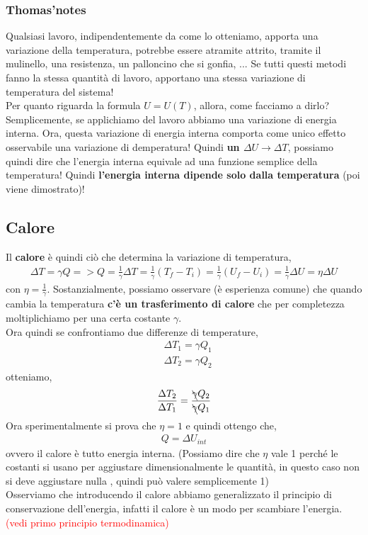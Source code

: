         \subsubsection{Thomas'notes}
            Qualsiasi lavoro, indipendentemente da come lo otteniamo, apporta una variazione della temperatura, potrebbe essere atramite attrito, tramite il mulinello, una resistenza, un palloncino che si gonfia, ... Se tutti questi metodi fanno la stessa quantità di lavoro, apportano una stessa variazione di temperatura del sistema! \\
            Per quanto riguarda la formula $U = U(T)$, allora, come facciamo a dirlo? Semplicemente, se applichiamo del lavoro abbiamo una variazione di energia interna. Ora, questa variazione di energia interna comporta come unico effetto osservabile una variazione di demperatura! Quindi \textbf{un $\Delta U\rightarrow \Delta T$}, possiamo quindi dire che l'energia interna equivale ad una funzione semplice della temperatura! Quindi \textbf{l'energia interna dipende solo dalla temperatura} (poi viene dimostrato)!

    \subsection{Calore}
        Il \textbf{calore} è quindi ciò che determina la variazione di temperatura,
        \begin{align*}
            \Delta T = \gamma Q => Q = \frac{1}{\gamma}\Delta T = \frac{1}{\gamma}(T_f - T_i) = \frac{1}{\gamma}(U_f - U_i) = \frac{1}{\gamma}\Delta U = \eta \Delta U
        \end{align*}
        con $\eta = \frac{1}{\gamma}$. Sostanzialmente, possiamo osservare (è esperienza comune) che quando cambia la temperatura \textbf{c'è un trasferimento di calore} che per completezza moltiplichiamo per una certa costante $\gamma$.\\
        Ora quindi se confrontiamo due differenze di temperature,
        \begin{align*}
            &\Delta T_1=\gamma Q_1\\
            &\Delta T_2=\gamma Q_2
        \end{align*}
        otteniamo,
        \begin{align*}
            \frac{\Delta T_2}{\Delta T_1}=\frac{\bcancel{\gamma} Q_2}{\bcancel{\gamma} Q_1}
        \end{align*}
        Ora sperimentalmente si prova che $\eta = 1$ e quindi ottengo che,
        \begin{align*}
            Q = \Delta U_{int}
        \end{align*}
        ovvero il calore è tutto energia interna. (Possiamo dire che $\eta$ vale 1 perché le costanti si usano per aggiustare dimensionalmente le quantità, in questo caso non si deve aggiustare nulla , quindi può valere semplicemente 1)\\
        Osserviamo che introducendo il calore abbiamo generalizzato il principio di conservazione dell'energia, infatti il calore è un modo per scambiare l'energia. \textcolor{Red}{(vedi primo principio termodinamica)}

